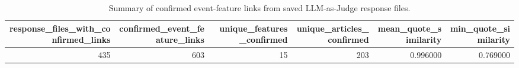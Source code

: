 \begin{table}
\caption{Summary of confirmed event-feature links from saved LLM-as-Judge response files.}
\label{tab:llm_judge_confirmed_summary}
\begin{tabular}{rrrrrr}
\toprule
response_files_with_confirmed_links & confirmed_event_feature_links & unique_features_confirmed & unique_articles_confirmed & mean_quote_similarity & min_quote_similarity \\
\midrule
435 & 603 & 15 & 203 & 0.996000 & 0.769000 \\
\bottomrule
\end{tabular}
\end{table}
